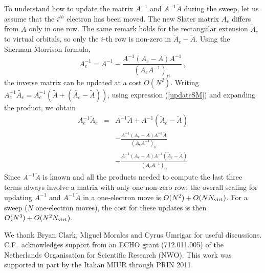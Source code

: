 \documentclass[aip,jcp,reprint,floatfix,onecolumn]{revtex4-1}
\begin{document}
To understand how to update the matrix $A^{-1}$ and $A^{-1}\tilde{A}$ during the sweep, let us assume that the $i^{th}$ electron has been moved.
The new Slater matrix $A_e$ differs from $A$ only in one row.  The same remark  holds for the rectangular extension $\tilde{A}_e$ to virtual orbitals, so only the $i$-th row is non-zero in $\tilde{A}_e -\tilde{A}$.  Using the Sherman-Morrison formula,
\begin{equation}
A_e^{-1} = A^{-1} -\frac{A^{-1} %
 (A_e-A) A^{-1}}{( A_eA^{-1})_{ii}}\,,
\label{updateSM}
\end{equation}
 the inverse matrix can be updated at a cost $O(N^2)$.
Writing $A_e^{-1} \tilde{A_e} = A_e^{-1}( \tilde{A} + (\tilde{A_e}-\tilde{A}))$, using expression (\ref{updateSM}) and expanding the product, we obtain
\begin{eqnarray}
A_e^{-1} \tilde{A}_e %
&= & A^{-1}\tilde{A} + A^{-1}(\tilde{A}_e-\tilde{A})\nonumber\\
& &  -\frac{A^{-1}  (A_e-A) A^{-1} \tilde{A}}{( A_eA^{-1})_{ii}}\nonumber\\
& &  -\frac{A^{-1}  (A_e-A) A^{-1} (\tilde{A}_e-\tilde{A})}{( A_eA^{-1})_{ii}}
\end{eqnarray}
Since $A^{-1}\tilde{A}$ is known and all the products needed to compute the last three terms always involve a matrix with only one non-zero row, the overall scaling for updating $A^{-1}$ and $A^{-1}\tilde{A}$ in a one-electron move is $O(N^2) + O (N N_{\rm virt})$.
For a sweep ($N$ one-electron moves), the cost for these updates is then $O(N^3) + O( N^2 N_{\rm virt})$.

\acknowledgments
We thank Bryan Clark, Miguel Morales and Cyrus Umrigar for useful discussions.
C.F.\ acknowledges support from an ECHO grant (712.011.005) of the Netherlands Organisation for Scientific Research (NWO).
This work was supported in part by the Italian MIUR through PRIN 2011.


\end{document}
